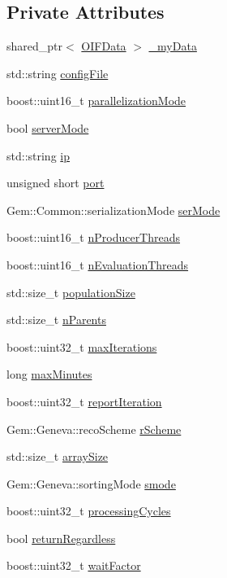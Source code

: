 \subsection*{Private Attributes}
\begin{DoxyCompactItemize}
\item 
shared\_\-ptr$<$ \hyperlink{classOIFData}{OIFData} $>$ \hyperlink{classOIFGeneva_ae130ae2db7c8c880ff426eefc9191949}{\_\-myData}
\item 
std::string \hyperlink{classOIFGeneva_abf5610433384454ae4884b2f17f01f01}{configFile}
\item 
boost::uint16\_\-t \hyperlink{classOIFGeneva_ae51bcfad038f5365a2ff5c4d0691e05b}{parallelizationMode}
\item 
bool \hyperlink{classOIFGeneva_a12fed8d5df83853111e8e9bba2b00b5e}{serverMode}
\item 
std::string \hyperlink{classOIFGeneva_a24b10918d314755d3c566ea8c17b2bc1}{ip}
\item 
unsigned short \hyperlink{classOIFGeneva_a49edc5e8fefa9137eab821b81f8015b1}{port}
\item 
Gem::Common::serializationMode \hyperlink{classOIFGeneva_aaad7df3d69cbe6399123820e7fef2a3c}{serMode}
\item 
boost::uint16\_\-t \hyperlink{classOIFGeneva_a4b3bfbf12d2911a081fc7c5feb9c4ae7}{nProducerThreads}
\item 
boost::uint16\_\-t \hyperlink{classOIFGeneva_a9afb57f9439eddc693b06456c7f1a4a6}{nEvaluationThreads}
\item 
std::size\_\-t \hyperlink{classOIFGeneva_a9797a7ec73f3bf9b192799813f601600}{populationSize}
\item 
std::size\_\-t \hyperlink{classOIFGeneva_a01cfc180dd253ea8767446e4116f8bb2}{nParents}
\item 
boost::uint32\_\-t \hyperlink{classOIFGeneva_ae2a0cd2de953edc56ffa0dbb743fc9af}{maxIterations}
\item 
long \hyperlink{classOIFGeneva_a48b49d12e4ecd4a0e19b31692224f2a7}{maxMinutes}
\item 
boost::uint32\_\-t \hyperlink{classOIFGeneva_a4419a9af665e5589174b4442fb3e44b9}{reportIteration}
\item 
Gem::Geneva::recoScheme \hyperlink{classOIFGeneva_a84d9c1da4a30943abe44cbc58162755f}{rScheme}
\item 
std::size\_\-t \hyperlink{classOIFGeneva_ae17ccd19943bfe1ced5f7b0373c36ee9}{arraySize}
\item 
Gem::Geneva::sortingMode \hyperlink{classOIFGeneva_a74949f91a856d291c760b6668ace8275}{smode}
\item 
boost::uint32\_\-t \hyperlink{classOIFGeneva_a1e194ecfec04056b27e32205839a3f60}{processingCycles}
\item 
bool \hyperlink{classOIFGeneva_a812f07c15fdfda372b6fb82ad9d3795a}{returnRegardless}
\item 
boost::uint32\_\-t \hyperlink{classOIFGeneva_ad40b4a27317aacf88a920b07c23010ab}{waitFactor}
\end{DoxyCompactItemize}


